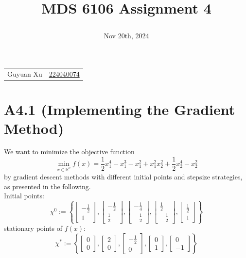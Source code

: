 \documentclass{article}
\newcommand{\secs}[1]{\section*{#1}}
\begin{document}
\title{\raggedright MDS 6106 Assignment 4}
\date{Nov 20th, 2024}
\maketitle

\noindent\begin{tabular}{@{}ll}
   Guyuan Xu &\href{mailto:224040074@link.cuhk.edu.cn}{224040074} \\
    
%
\end{tabular}


\secs{A4.1 (Implementing the Gradient Method)}
We want to minimize the objective function
\[
\min_{x\in\mathbb{R}^2} f(x) = \frac{1}{2}x_1^4-x_1^3-x_1^2+x_1^2x_2^2+\frac{1}{2}x_2^4-x_2^2
\]
by gradient descent methods with different initial points and stepsize strategies, as presented in the following.\\

\noindent Initial points: 
\[
\chi^0 := \left\{
\begin{bmatrix}
-\frac{1}{2} \\ 1
\end{bmatrix},
\begin{bmatrix}
-\frac{1}{2} \\ \frac{1}{2}
\end{bmatrix},
\begin{bmatrix}
-\frac{1}{4} \\ -\frac{1}{2}
\end{bmatrix},
\begin{bmatrix}
\frac{1}{2} \\ -\frac{1}{2}
\end{bmatrix},
\begin{bmatrix}
\frac{1}{2} \\ 1
\end{bmatrix}
\right\}
\]
\noindent stationary points of $f(x)$:
\[
\chi^* := \left\{
\begin{bmatrix}
0 \\ 0
\end{bmatrix},
\begin{bmatrix}
2 \\ 0
\end{bmatrix},
\begin{bmatrix}
-\frac{1}{2} \\ 0
\end{bmatrix},
\begin{bmatrix}
0 \\ 1
\end{bmatrix},
\begin{bmatrix}
0 \\ -1
\end{bmatrix}
\right\}
\]
\end{document}
